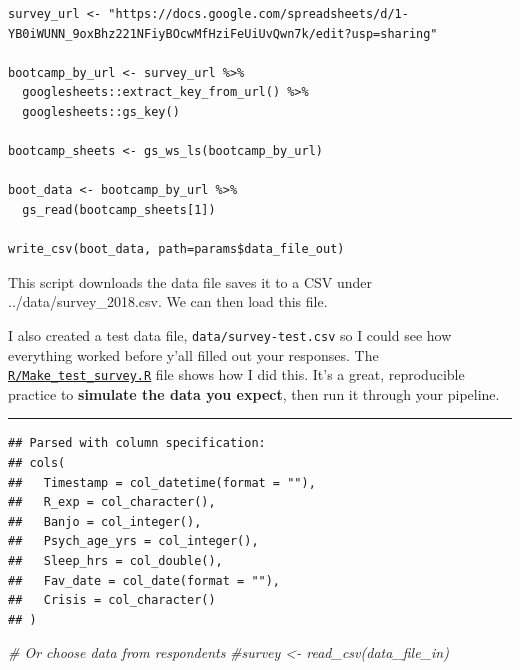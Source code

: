 \documentclass[]{article}
\newenvironment{Shaded}{\begin{snugshade}}{\end{snugshade}}
\newcommand{\KeywordTok}[1]{\textcolor[rgb]{0.13,0.29,0.53}{\textbf{#1}}}
\newcommand{\StringTok}[1]{\textcolor[rgb]{0.31,0.60,0.02}{#1}}
\newcommand{\CommentTok}[1]{\textcolor[rgb]{0.56,0.35,0.01}{\textit{#1}}}
\newcommand{\OperatorTok}[1]{\textcolor[rgb]{0.81,0.36,0.00}{\textbf{#1}}}
\newcommand{\NormalTok}[1]{#1}
\begin{document}
\begin{verbatim}
survey_url <- "https://docs.google.com/spreadsheets/d/1-YB0iWUNN_9oxBhz221NFiyBOcwMfHziFeUiUvQwn7k/edit?usp=sharing"

bootcamp_by_url <- survey_url %>%
  googlesheets::extract_key_from_url() %>%
  googlesheets::gs_key()

bootcamp_sheets <- gs_ws_ls(bootcamp_by_url)

boot_data <- bootcamp_by_url %>%
  gs_read(bootcamp_sheets[1])
          
write_csv(boot_data, path=params$data_file_out)
\end{verbatim}

This script downloads the data file saves it to a CSV under
../data/survey\_2018.csv. We can then load this file.

I also created a test data file, \texttt{data/survey-test.csv} so I
could see how everything worked before y'all filled out your responses.
The \href{../R/Make_test_survey.R}{\texttt{R/Make\_test\_survey.R}} file
shows how I did this. It's a great, reproducible practice to
\textbf{simulate the data you expect}, then run it through your
pipeline.

\begin{center}\rule{0.5\linewidth}{\linethickness}\end{center}

\begin{Shaded}
\end{Shaded}

\begin{verbatim}
## Parsed with column specification:
## cols(
##   Timestamp = col_datetime(format = ""),
##   R_exp = col_character(),
##   Banjo = col_integer(),
##   Psych_age_yrs = col_integer(),
##   Sleep_hrs = col_double(),
##   Fav_date = col_date(format = ""),
##   Crisis = col_character()
## )
\end{verbatim}

\begin{Shaded}
\begin{Highlighting}[]
\CommentTok{# Or choose data from respondents}
\CommentTok{#survey <- read_csv(data_file_in)}
\end{Highlighting}
\end{Shaded}
\end{document}

